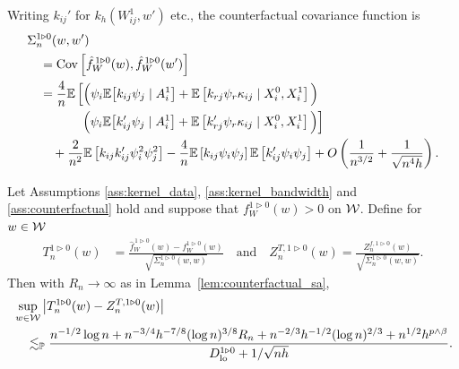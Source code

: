 \begin{lemma}
  \label{lem:counterfactual_covariance_structure}

  Writing $k_{i j}'$ for $k_h(W_{i j}^1, w')$ etc.,
  the counterfactual covariance function is
  \begin{align*}
    &\Sigma_n^{1 \triangleright 0}(w,w') \\
    &\quad=
    \operatorname{Cov}\left[
      \hat f_W^{\,1 \triangleright 0}(w),
      \hat f_W^{\,1 \triangleright 0}(w')
    \right] \\
    &\quad=
    \frac{4}{n}
    \mathbb{E}\left[
      \Big(
        \psi_i
        \mathbb{E}\big[
          k_{i j} \psi_j
          \mid A_i^1
        \big]
        + \mathbb{E}\left[
          k_{r j} \psi_r
          \kappa_{i j}
          \mid X_i^0, X_i^1
        \right]
      \Big)
      \right. \\
      &\left.
      \qquad\qquad\,
      \Big(
        \psi_i
        \mathbb{E}\big[
          k_{i j}' \psi_j
          \mid A_i^1
        \big]
        + \mathbb{E}\left[
          k_{r j}' \psi_r \kappa_{i j}
          \mid X_i^0, X_i^1
        \right]
      \Big)
    \right] \\
    &\qquad+
    \frac{2}{n^2}
    \mathbb{E}\left[
      k_{i j} k_{i j}'
      \psi_i^2 \psi_j^2
    \right]
    - \frac{4}{n}
    \mathbb{E}\left[
      k_{i j} \psi_i \psi_j
    \right]
    \mathbb{E}\left[
      k_{i j}' \psi_i \psi_j
    \right]
    + O\left( \frac{1}{n^{3/2}} + \frac{1}{\sqrt{n^4h}} \right).
  \end{align*}

\end{lemma}

\begin{lemma}
  \label{lem:counterfactual_infeasible_t_statistic}

  Let Assumptions \ref{ass:kernel_data},
  \ref{ass:kernel_bandwidth} and
  \ref{ass:counterfactual}
  hold and suppose that
  $f_W^{1 \triangleright 0}(w) > 0$ on $\mathcal{W}$.
  Define for $w \in \mathcal{W}$
  \begin{align*}
    T_n^{1 \triangleright 0}(w)
    &= \frac{\hat f_W^{\,1 \triangleright 0}(w)
    - f_W^{1 \triangleright 0}(w)}
    {\sqrt{\Sigma_n^{1 \triangleright 0}(w,w)}}
    \quad\text{and}\quad
    Z_n^{T, 1 \triangleright 0}(w)
    = \frac{Z_n^{f, 1 \triangleright 0}(w)}
    {\sqrt{\Sigma_n^{1 \triangleright 0}(w,w)}}.
  \end{align*}
  Then with $R_n \to \infty$ as in Lemma~\ref{lem:counterfactual_sa},
  \begin{align*}
    &\sup_{w \in \mathcal{W}}
    \left|
    T_n^{1 \triangleright 0}(w) - Z_n^{T, 1 \triangleright 0}(w)
    \right| \\
    &\quad\lesssim_{\mathbb{P}}
    \frac{
      n^{-1/2} \log n
      + n^{-3/4} h^{-7/8} (\log n)^{3/8} R_n
      + n^{-2/3} h^{-1/2} (\log n)^{2/3}
    + n^{1/2} h^{p \wedge \beta}}
    {D_{\textup{lo}}^{1 \triangleright 0} + 1/\sqrt{n h}}.
  \end{align*}

\end{lemma}

